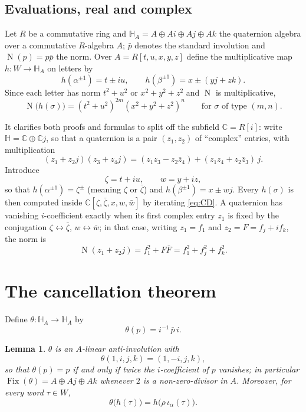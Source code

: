\documentclass[11pt]{article}
\newtheorem{lemma}[theorem]{Lemma}
\theoremstyle{definition}
\theoremstyle{remark}
\newcommand{\HH}{\mathbb{H}}
\newcommand{\CC}{\mathbb{C}}
\newcommand{\bz}{\bar{\zeta}}
\newcommand{\bw}{\bar{w}}
\newcommand{\ia}{\iota_\alpha}
\DeclareMathOperator{\Fix}{Fix}
\DeclareMathOperator{\N}{N}
\begin{document}
\subsection{Evaluations, real and complex}
Let $R$ be a commutative ring and $\HH_A=A\oplus Ai\oplus Aj\oplus Ak$ the quaternion algebra over a commutative $R$-algebra $A$; $\bar p$ denotes the standard involution and $\N(p)=p\bar p$ the norm. Over $A=R[t,u,x,y,z]$ define the multiplicative map $h\colon W\to\HH_A$ on letters by
\[
h(\alpha^{\pm1})=t\pm iu,\qquad h(\beta^{\pm1})=x\pm(yj+zk).
\]
Since each letter has norm $t^2+u^2$ or $x^2+y^2+z^2$ and $\N$ is multiplicative,
\begin{equation}\label{eq:norm-of-word}
\N\bigl(h(\sigma)\bigr)=(t^2+u^2)^{2m}(x^2+y^2+z^2)^{n}\qquad\text{for }\sigma\text{ of type }(m,n).
\end{equation}

It clarifies both proofs and formulas to split off the subfield $\CC=R[i]$: write $\HH=\CC\oplus\CC j$, so that a quaternion is a pair $(z_1,z_2)$ of ``complex'' entries, with multiplication
\begin{equation}\label{eq:CD}
(z_1+z_2j)(z_3+z_4j)=(z_1z_3-z_2\bar z_4)+(z_1z_4+z_2\bar z_3)\,j .
\end{equation}
Introduce
\[
\zeta=t+iu,\qquad w=y+iz,
\]
so that $h(\alpha^{\pm1})=\zeta^{\pm}$ (meaning $\zeta$ or $\bz$) and $h(\beta^{\pm1})=x\pm wj$. Every $h(\sigma)$ is then computed inside $\CC[\zeta,\bz,x,w,\bw]$ by iterating \eqref{eq:CD}. A quaternion has vanishing $i$-coefficient exactly when its first complex entry $z_1$ is fixed by the conjugation $\zeta\leftrightarrow\bz$, $w\leftrightarrow\bw$; in that case, writing $z_1=f_1$ and $z_2=F=f_j+if_k$, the norm is
\begin{equation}\label{eq:norm-complex}
\N(z_1+z_2j)=f_1^2+F\bar F=f_1^2+f_j^2+f_k^2 .
\end{equation}

\section{The cancellation theorem}\label{sec:cancel}

Define $\theta\colon\HH_A\to\HH_A$ by
\[
\theta(p)=i^{-1}\,\bar p\,i .
\]

\begin{lemma}\label{lem:theta}
$\theta$ is an $A$-linear anti-involution with
\[
\theta(1,i,j,k)=(1,-i,j,k),
\]
so that $\theta(p)=p$ if and only if twice the $i$-coefficient of $p$ vanishes; in particular $\Fix(\theta)=A\oplus Aj\oplus Ak$ whenever $2$ is a non-zero-divisor in $A$. Moreover, for every word $\tau\in W$,
\[
\theta\bigl(h(\tau)\bigr)=h\bigl(\rho\,\ia(\tau)\bigr).
\]
\end{lemma}
\end{document}
